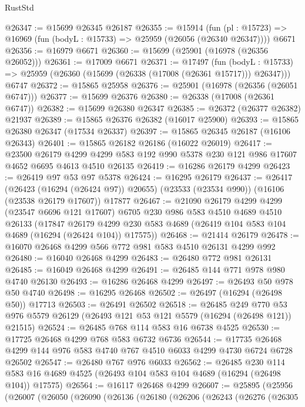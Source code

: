 \begin{lexlean}{RustStd}
\begin{coremodule}
@26347 := @15699 @26345 @26187
@26355 := @15914
    (fun (pl : @15723) => @16969 (fun (bodyL : @15733) => @25959 (@26056 (@26340 @26347))))
    @6671
@26356 := @16979 @6671
@26360 := @15699 (@25901 (@16978 (@26356 @26052)))
@26361 := @17009 @6671
@26371 := @17497
    (fun (bodyL : @15733) => @25959 (@26360 (@15699 (@26338 (@17008 (@26361 @15717))) @26347)))
    @6747
@26372 := @15865 @25958
@26376 := @25901 (@16978 (@26356 (@26051 @6747)))
@26377 := @15699 @26376
@26380 := @26338 (@17008 (@26361 @6747))
@26382 := @15699 @26380 @26347
@26385 := @26372 (@26377 @26382) @21937
@26389 := @15865 @26376 @26382 (@16017 @25900)
@26393 := @15865 @26380 @26347 (@17534 @26337)
@26397 := @15865 @26345 @26187 (@16106 @26343)
@26401 := @15865 @26182 @26186 (@16022 @26019)
@26417 := @23500
    @26179
    @4299
    @4299
    @583
    @192
    @990
    @5378
    @230
    @121
    @986
    @17607
    @4652
    @6695
    @4613
    @4510
    @26135
@26419 := @16286 @26179 @4299
@26423 := @26419 @97 @53 @97 @5378
@26424 := @16295 @26179
@26437 := @26417
    (@26423 (@16294 (@26424 @97)) @20655)
    (@23533 (@23534 @990))
    (@16106 (@23538 @26179 @17607))
    @17877
@26467 := @21090
    @26179
    @4299
    @4299
    (@23547 @6696 @121 @17607)
    @6705
    @230
    @986
    @583
    @4510
    @4689
    @4510
    @26133
    (@17847
      @26179
      @4299
      @230
      @583
      @4689
      (@26419 @104 @583 @104 @4689 (@16294 (@26424 @104)) @17575))
@26468 := @21414 @26179
@26478 := @16070 @26468 @4299 @566 @772 @981 @583 @4510 @26131 @4299 @992
@26480 := @16040 @26468 @4299
@26483 := @26480 @772 @981 @26131
@26485 := @16049 @26468 @4299
@26491 := @26485 @144 @771 @978 @980 @4740 @26130
@26493 := @16286 @26468 @4299
@26497 := @26493 @50 @978 @50 @4740
@26498 := @16295 @26468
@26502 := @26497 (@16294 (@26498 @50)) @17713
@26503 := @26491 @26502
@26518 := @26485
    @249
    @770
    @53
    @976
    @5579
    @26129
    (@26493 @121 @53 @121 @5579 (@16294 (@26498 @121)) @21515)
@26524 := @26485 @768 @114 @583 @16 @6738 @4525
@26530 := @17725 @26468 @4299 @768 @583 @6732 @6736
@26544 := @17735 @26468 @4299 @144 @976 @583 @4740 @767 @4510 @6033 @4299 @4730 @6724 @6728 @26502
@26547 := @26480 @767 @976 @6033
@26562 := @26485
    @230
    @114
    @583
    @16
    @4689
    @4525
    (@26493 @104 @583 @104 @4689 (@16294 (@26498 @104)) @17575)
@26564 := @16117 @26468 @4299
@26607 := @25895
    (@25956
      (@26007
        (@26050
          (@26090
            (@26136
              (@26180
                (@26206
                  (@26243
                    (@26276
                      (@26305

\end{coremodule}
\end{lexlean}
